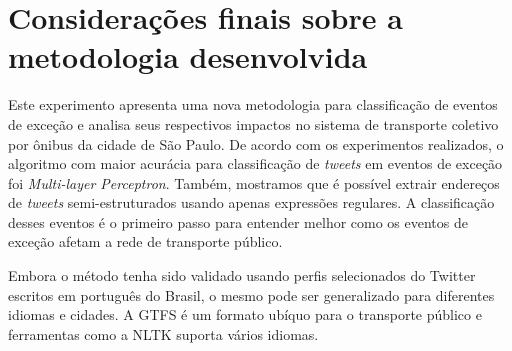 \documentclass[
	12pt,				%
	oneside,			%
	a4paper,			%
	english,			%
	brazil				%
	]{abntex2ppgsi}
\begin{document}
\section{Considerações finais sobre a metodologia desenvolvida}

Este experimento apresenta uma nova metodologia para classificação de eventos de exceção e analisa seus respectivos impactos no sistema de transporte coletivo por ônibus da cidade de São Paulo. De acordo com os experimentos realizados, o algoritmo com maior  acurácia para classificação de \textit{tweets} em eventos de exceção foi \textit{Multi-layer Perceptron}. Também, mostramos que é possível extrair endereços de \textit{tweets} semi-estruturados usando apenas expressões regulares. A classificação desses eventos é o primeiro passo para entender melhor como os eventos de exceção afetam a rede de transporte público.

Embora o método tenha sido validado usando perfis selecionados do Twitter escritos em português do Brasil, o mesmo pode ser generalizado para diferentes idiomas e cidades. A GTFS é um formato ubíquo para o transporte público e ferramentas como a NLTK suporta vários idiomas.



\end{document}
